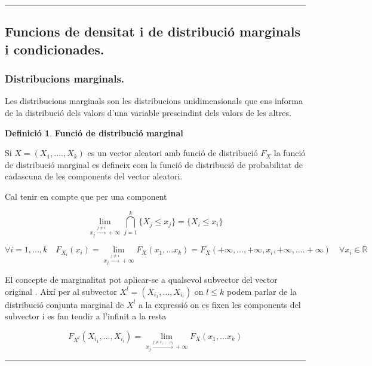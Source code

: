 \documentclass[
  catalan,
]{article}
\theoremstyle{definition}
\newtheorem{definition}{Definició}[section]
\theoremstyle{definition}
\theoremstyle{definition}
\theoremstyle{definition}
\theoremstyle{remark}
\begin{document}
\begin{center}\rule{0.5\linewidth}{0.5pt}\end{center}

\subsection{Funcions de densitat i de distribució marginals i condicionades.}\label{funcions-de-densitat-i-de-distribuciuxf3-marginals-i-condicionades.}

\subsubsection{Distribucions marginals.}\label{distribucions-marginals.}

Les distribucions marginals son les distribucions unidimensionals que ens informa de la distribució dels valors d'una variable prescindint dels valors de les altres.

\begin{definition}
\textbf{Funció de distribució marginal}

Si \(X=(X_1,...., X_k)\) es un vector aleatori amb funció de distribució \(F_X\) la funció de distribució marginal es defineix com la funció de distribució de probabilitat de cadascuna de les components del vector aleatori.

Cal tenir en compte que per una component

\[
\lim_{x_j \xrightarrow{j \neq i} +\infty} \bigcap_{j=1}^k \{X_j \leq x_j\}=\{X_i \leq x_i\}
\]

\[
\forall i=1,...,k \quad F_{X_i}
(x_i)=\lim_{x_j \xrightarrow{j \neq i} +\infty} F_X(x_1,...x_k)= F_X(+\infty,...,+\infty,x_i,+\infty,....+\infty) \quad \forall x_i \in \mathbb{R}
\]

El concepte de marginalitat pot aplicar-se a qualsevol subvector del vector original . Així per al subvector \(X^l=(X_{i_1},...,X_{i_l})\) on \(l \leq k\) podem parlar de la distribució conjunta marginal de \(X^l\) a la expressió on es fixen les components del subvector i es fan tendir a l'infinit a la resta

\[
F_{X^l}(X_{i_1},...,X_{i_l})=\lim_{x_j \xrightarrow {j \neq i_1,...,i_l} +\infty} F_X(x_1,...x_k)  \label{eq:Fmarginal}
\]
\end{definition}

\begin{center}\rule{0.5\linewidth}{0.5pt}\end{center}
\end{document}
